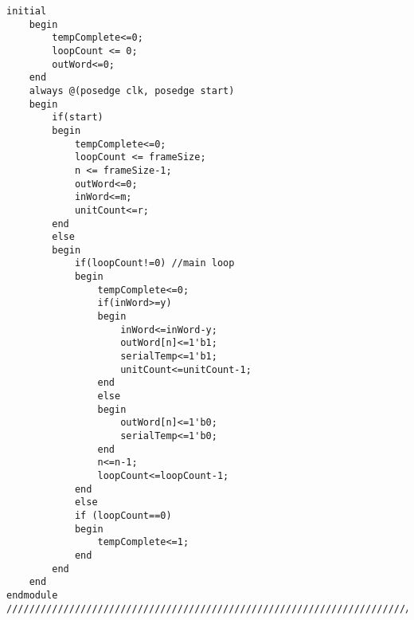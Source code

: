 \begin{lstlisting}[style=verilog-style,basicstyle=\tiny]
	initial
	begin
		tempComplete<=0;
		loopCount <= 0;
		outWord<=0;
	end
	always @(posedge clk, posedge start)  
	begin		
		if(start)
		begin
			tempComplete<=0;
			loopCount <= frameSize;
			n <= frameSize-1;
			outWord<=0;
			inWord<=m;
			unitCount<=r;
		end
		else 
		begin
			if(loopCount!=0) //main loop
			begin
				tempComplete<=0;
				if(inWord>=y) 
				begin
					inWord<=inWord-y;
					outWord[n]<=1'b1;
					serialTemp<=1'b1;
					unitCount<=unitCount-1;
				end	
				else
				begin
					outWord[n]<=1'b0;
					serialTemp<=1'b0;
				end
				n<=n-1;
				loopCount<=loopCount-1;
			end
			else
			if (loopCount==0)
			begin
				tempComplete<=1;
			end
		end
	end
endmodule
//////////////////////////////////////////////////////////////////////////////////
\end{lstlisting}

\newpage
